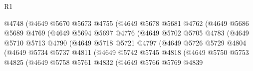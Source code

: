 \begin{lexlean}{R1}
\begin{coremodule}
                              @4748
                              (@4649
                                @5670
                                @5673
                                @4755
                                (@4649
                                  @5678
                                  @5681
                                  @4762
                                  (@4649
                                    @5686
                                    @5689
                                    @4769
                                    (@4649
                                      @5694
                                      @5697
                                      @4776
                                      (@4649
                                        @5702
                                        @5705
                                        @4783
                                        (@4649
                                          @5710
                                          @5713
                                          @4790
                                          (@4649
                                            @5718
                                            @5721
                                            @4797
                                            (@4649
                                              @5726
                                              @5729
                                              @4804
                                              (@4649
                                                @5734
                                                @5737
                                                @4811
                                                (@4649
                                                  @5742
                                                  @5745
                                                  @4818
                                                  (@4649
                                                    @5750
                                                    @5753
                                                    @4825
                                                    (@4649
                                                      @5758
                                                      @5761
                                                      @4832
                                                      (@4649
                                                        @5766
                                                        @5769
                                                        @4839

\end{coremodule}
\end{lexlean}
